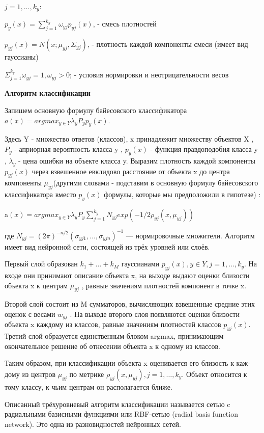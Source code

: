 $j = 1, . . . , k_y$:

$p_y(x) = \sum ^{k _y} _{j = 1} \omega _{yj} p _{yj}(x)$,  - смесь плотностей

$p_{yj}(x) = N(x; \mu _{yj} ,\Sigma _{yj})$,  - плотность каждой компоненты смеси (имеет вид гауссианы)

$\Sigma ^{k_y} _{j = 1} \omega _{yj} = 1, \omega _{yj} > 0$; - условия нормировки и неотрицательности весов

\textbf{Алгоритм классификации}

Запишем основную формулу байесовского классификатора $a(x) = argmax _{y \in Y} \lambda _y P _y p_y(x)$.

Здесь Y - множество ответов (классов), x принадлежит множеству объектов X , $P_y$ - априорная вероятность класса y , $p_y(x)$ - функция правдоподобия класса y , $\lambda_{y}$ - цена ошибки на объекте класса y. Выразим плотность каждой компоненты $p_{yj}(x)$ через взвешенное евклидово расстояние от объекта x до центра компоненты $\mu _{yj}$(другими словами - подставим в основную формулу байесовского классификатора вместо $p_y(x)$ формулы, которые мы предположили в гипотезе) :


a$(x) = argmax _{y \in Y} \lambda _y P _y \sum ^{k_y} _{j = 1} N _{yj} exp(-1/2 \rho  _{yj} (x, \mu _{yj}))$


где $N _{yj} = (2\pi)^{-n/2} (\sigma _{yj1},\dots , \sigma _{yjn})^{-1}$ — нормировочные множители. Алгоритм имеет вид нейронной сети, состоящей из трёх уровней или слоёв.

Первый слой образован $k_1 + \dots+ k_M$ гауссианами $p_{yj}(x), y \in Y , j = 1, \dots, k_y$. На входе они принимают описание объекта x, на выходе выдают оценки близости объекта x к центрам $\mu _{yj}$ , равные значениям плотностей компонент в точке x.

Второй слой состоит из M сумматоров, вычисляющих взвешенные средние этих оценок с весами $w_{yj}$ . На выходе второго слоя появляются оценки близости объекта x каждому из классов, равные значениям плотностей классов $p_{yj}(x)$.
Третий слой образуется единственным блоком argmax, принимающим окончательное решение об отнесении объекта x к одному из классов.

Таким образом, при классификации объекта x оценивается его близость к каж- дому из центров $\mu _{yj}$ по метрике $\rho _{yj}(x, \mu _{yj}), j = 1, \dots, k_y$. Объект относится к тому классу, к чьим центрам он располагается ближе.

Описанный трёхуровневый алгоритм классификации называется сетью c радиальными базисными функциями или RBF-сетью (radial basis function network). Это одна из разновидностей нейронных сетей.

